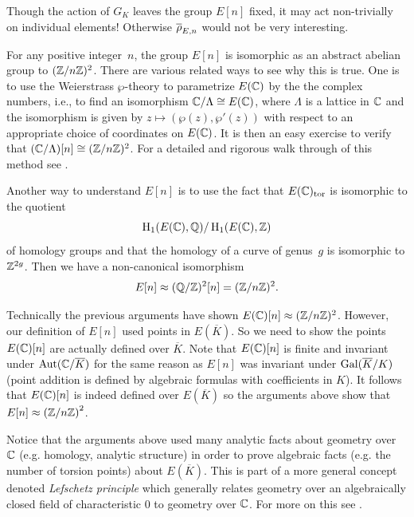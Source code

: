 \begin{warning}
Though the action of $G_K$ leaves the group $E[n]$ fixed,
it may act non-trivially on individual elements! Otherwise
$\overline{\rho}_{E,n}$ would not be very interesting.
\end{warning}

For any positive integer~$n$, the group $E[n]$ is isomorphic as an
abstract abelian group to $(\mathbb{Z}/n\mathbb{Z})^2$.  There are various
related ways to see why this is true. One is to use the Weierstrass
$\wp$-theory to parametrize $E(\mathbb{C})$ by the the complex numbers, i.e.,
to find an isomorphism $\mathbb{C}/\Lambda \cong E(\mathbb{C})$, where $\Lambda$ is a
lattice in $\mathbb{C}$ and the isomorphism is given by $z\mapsto
(\wp(z),\wp'(z))$ with respect to an appropriate choice of coordinates
on $E(\mathbb{C})$.  It is then an easy exercise to verify that
$(\mathbb{C}/\Lambda)[n]\cong (\mathbb{Z}/n\mathbb{Z})^2$.
For a detailed and rigorous walk through of this method see
\cite[Ch.~1.4]{diamond-shurman}.

Another way to understand $E[n]$ is to use the fact
that $E(\mathbb{C})_{\operatorname{tor}}$ is isomorphic
to the quotient
$$\operatorname{H}_1(E(\mathbb{C}),\mathbb{Q})/\operatorname{H}_1(E(\mathbb{C}),\mathbb{Z})$$
of homology groups and that the homology of a curve
of genus~$g$ is isomorphic to $\mathbb{Z}^{2g}$.
Then we have a non-canonical isomorphism
$$
 E[n]\approx (\mathbb{Q}/\mathbb{Z})^2[n] = (\mathbb{Z}/n\mathbb{Z})^2.
$$

Technically the previous arguments have shown $E(\mathbb{C})[n] \approx (\mathbb{Z}/n\mathbb{Z})^2$.
However, our definition of $E[n]$ used points in $E(\overline{K})$.
So we need to show the points $E(\mathbb{C})[n]$ are actually defined over
$\overline{K}$. Note that $E(\mathbb{C})[n]$ is finite and invariant under
$\operatorname{Aut}(\mathbb{C}/\overline{K})$ for the same reason as $E[n]$ was invariant under
$\operatorname{Gal}(\overline{K}/K)$ (point addition is defined by algebraic formulas with
coefficients in $K$). It follows that $E(\mathbb{C})[n]$ is indeed defined over 
$E(\overline{K})$ so the arguments above show that
$E[n] \approx \left(\mathbb{Z}/n\mathbb{Z}\right)^2$.

\begin{remark}
	Notice that the arguments above used many analytic facts about
	geometry over $\mathbb{C}$ (e.g. homology, analytic structure) in order to
	prove algebraic facts (e.g. the number of torsion points) about
	$E(\overline{K})$. This is part of a more general concept denoted
	\emph{Lefschetz principle} which generally relates geometry over an
	algebraically closed field of characteristic $0$ to geometry over
	$\mathbb{C}$. For more on this see \cite[Ch.~VI.6]{silverman:aec}.
\end{remark}

